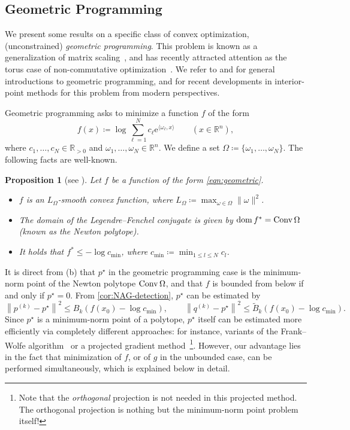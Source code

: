 \documentclass[11pt,a4paper]{article}
\theoremstyle{definition}
\theoremstyle{plain}
\newtheorem{prop}[prop]{Proposition}
\newcommand{\RR}{{\mathbb{R}}}
\newcommand{\rme}{{\mathrm{e}}}
\newcommand{\dom}{\mathop{\rm dom}}
\newcommand{\conv}{\mathop{\rm Conv}}
\begin{document}
\subsection{Geometric Programming}\label{sec:geometric}
We present some results on a specific class of convex optimization, (unconstrained) \textit{geometric programming}.
This problem is known as a generalization of matrix scaling~\cite{HHS2024,Sinkhorn1964}, and has recently attracted attention as the torus case of non-commutative optimization~\cite{BFGOWW2019}.
We refer to \cite{BKVH2007} and \cite[Chapter~4.5]{BV2004} for general introductions to geometric programming, and \cite{BLNW2020} for recent developments in interior-point methods for this problem from modern perspectives.

Geometric programming asks to minimize a function $f$ of the form
\begin{equation}\label{eqn:geometric}
    f(x) \coloneqq \log\sum_{\ell = 1}^Nc_\ell\rme^{\langle \omega_\ell, x\rangle} \qquad (x \in \RR^n),
\end{equation}
where $c_1, \ldots, c_N \in \RR_{>0}$ and $\omega_1, \ldots, \omega_N \in \RR^n$.
We define a set $\Omega \coloneqq \{\omega_1, \ldots, \omega_N\}$.
The following facts are well-known.
\begin{prop}[{see \cite{BLNW2020}}]\label{prop:geometric}
    Let $f$ be a function of the form \eqref{eqn:geometric}.
    \begin{itemize}
        \item[(a)] $f$ is an $L_\Omega$-smooth convex function, where $L_\Omega \coloneqq \max_{\omega \in \Omega}\|\omega\|^2$.
        \item[(b)] The domain of the Legendre--Fenchel conjugate is given by $\dom f^\ast = \conv\Omega$ (known as the Newton polytope).
        \item[(c)] It holds that $f^\ast \le -\log c_{\mathrm{min}}$, where $c_{\mathrm{min}} \coloneqq \min_{1 \le l \le N}c_l$.
    \end{itemize}
\end{prop}

It is direct from (b) that $p^\star$ in the geometric programming case is the minimum-norm point of the Newton polytope $\conv\Omega$, and that $f$ is bounded from below if and only if $p^\star = 0$.
From \cref{cor:NAG-detection}, $p^\star$ can be estimated by
\[
    \left\|p^{(k)} - p^\star\right\|^2 \le B_k(f(x_0) -\log c_{\mathrm{min}}),\qquad
    \left\|q^{(k)} - p^\star\right\|^2 \le \tilde B_k(f(x_0) -\log c_{\mathrm{min}}).
\]
Since $p^\star$ is a minimum-norm point of a polytope, $p^\star$ itself can be estimated more efficiently via completely different approaches: for instance, variants of the Frank--Wolfe algorithm~\cite{LJ2015} or a projected gradient method~\cite{NNG2019}\footnote{Note that the \textit{orthogonal} projection is not needed in this projected method. The orthogonal projection is nothing but the minimum-norm point problem itself!}.
However, our advantage lies in the fact that minimization of $f$, or of $g$ in the unbounded case, can be performed simultaneously, which is explained below in detail.
\end{document}
